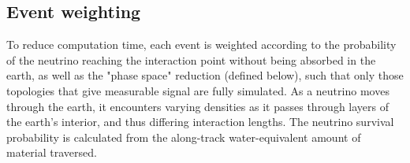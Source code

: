 

\subsection{Event weighting}
\label{sec:weights}
To reduce computation time,
each event is weighted according to the probability of the neutrino reaching the interaction point without being absorbed in the earth, as well as
the "phase space" reduction (defined below), such that only those topologies that give measurable signal are fully simulated. 
As a neutrino moves through the earth, it encounters varying
densities as it passes through layers of the earth's interior,
and thus differing interaction lengths. 
The neutrino survival probability is calculated from the along-track
water-equivalent amount of material traversed.

